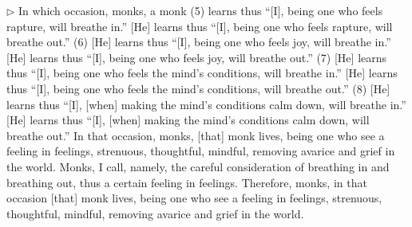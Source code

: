 \addtocounter{sennum}{-3}
$\triangleright$  In which occasion, monks, a monk (5) learns thus ``[I], being one who feels rapture, will breathe in.'' [He] learns thus ``[I], being one who feels rapture, will breathe out.'' (6) [He] learns thus ``[I], being one who feels joy, will breathe in.'' [He] learns thus ``[I], being one who feels joy, will breathe out.'' (7) [He] learns thus ``[I], being one who feels the mind's conditions, will breathe in.'' [He] learns thus ``[I], being one who feels the mind's conditions, will breathe out.'' (8) [He] learns thus ``[I], [when] making the mind's conditions calm down, will breathe in.'' [He] learns thus ``[I], [when] making the mind's conditions calm down, will breathe out.''  In that occasion, monks, [that] monk lives, being one who see a feeling in feelings, strenuous, thoughtful, mindful, removing avarice and grief in the world.  Monks, I call, namely, the careful consideration of breathing in and breathing out, thus a certain feeling in feelings. Therefore, monks, in that occasion [that] monk lives, being one who see a feeling in feelings, strenuous, thoughtful, mindful, removing avarice and grief in the world.\\


